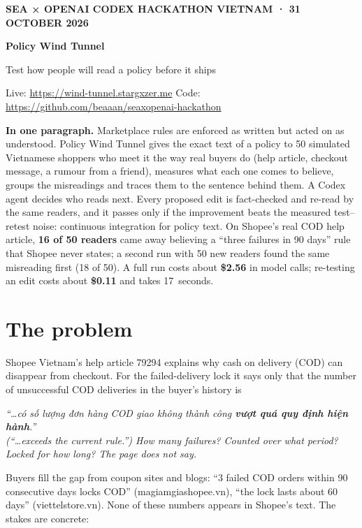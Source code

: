 \documentclass[11pt,a4paper]{article}
\newcommand{\hl}[1]{\textcolor{amber}{\textbf{#1}}}
\begin{document}
{\sffamily
{\small\color{cyan}\textbf{SEA × OPENAI CODEX HACKATHON VIETNAM · 31 OCTOBER 2026}}\par\vspace{0.6ex}
{\LARGE\bfseries\color{ink} Policy Wind Tunnel}\par\vspace{0.3ex}
{\large\color{muted} Test how people will read a policy before it ships}\par\vspace{0.4ex}
{\small\color{muted} Live: \url{https://wind-tunnel.stargxzer.me} \quad Code: \url{https://github.com/beaaan/seaxopenai-hackathon}}\par}
\vspace{1ex}

\noindent\colorbox{palegray}{\parbox{\dimexpr\linewidth-2\fboxsep}{\vspace{0.6ex}
\textbf{In one paragraph.} Marketplace rules are enforced as written but acted on as understood. Policy Wind Tunnel gives the exact text of a policy to 50 simulated Vietnamese shoppers who meet it the way real buyers do (help article, checkout message, a rumour from a friend), measures what each one comes to believe, groups the misreadings and traces them to the sentence behind them. A Codex agent decides who reads next. Every proposed edit is fact-checked and re-read by the same readers, and it passes only if the improvement beats the measured test--retest noise: continuous integration for policy text. On Shopee's real COD help article, \hl{16 of 50 readers} came away believing a ``three failures in 90 days'' rule that Shopee never states; a second run with 50 new readers found the same misreading first (18 of 50). A full run costs about \textbf{\$2.56} in model calls; re-testing an edit costs about \textbf{\$0.11} and takes 17~seconds.
\vspace{0.6ex}}}

\section{The problem}

Shopee Vietnam's help article 79294 explains why cash on delivery (COD) can disappear from checkout. For the failed-delivery lock it says only that the number of unsuccessful COD deliveries in the buyer's history is
\begin{center}
\begin{minipage}{0.88\linewidth}
\itshape ``\ldots có số lượng đơn hàng COD giao không thành công \textup{\hl{vượt quá quy định hiện hành}}.''\\
\upshape\small\color{muted}(``\ldots exceeds the current rule.'') How many failures? Counted over what period? Locked for how long? The page does not say.
\end{minipage}
\end{center}
Buyers fill the gap from coupon sites and blogs: ``3 failed COD orders within 90 consecutive days locks COD'' (magiamgiashopee.vn), ``the lock lasts about 60 days'' (viettelstore.vn). None of these numbers appears in Shopee's text. The stakes are concrete:
\end{document}
